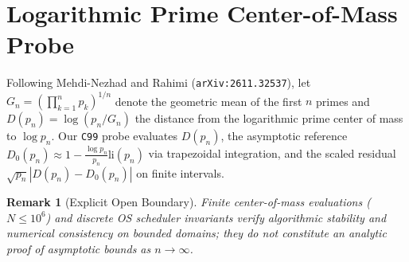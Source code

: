 \documentclass[11pt,a4paper]{article}
\newtheorem{remark}{Remark}
\begin{document}
\section{Logarithmic Prime Center-of-Mass Probe}
Following Mehdi-Nezhad and Rahimi (\texttt{arXiv:2611.32537}), let $G_n = \left(\prod_{k=1}^n p_k\right)^{1/n}$ denote the geometric mean of the first $n$ primes and $D(p_n) = \log(p_n / G_n)$ the distance from the logarithmic prime center of mass to $\log p_n$. Our \texttt{C99} probe evaluates $D(p_n)$, the asymptotic reference $D_0(p_n) \approx 1 - \frac{\log p_n}{p_n}\mathrm{li}(p_n)$ via trapezoidal integration, and the scaled residual $\sqrt{p_n}|D(p_n) - D_0(p_n)|$ on finite intervals.

\begin{remark}[Explicit Open Boundary]
Finite center-of-mass evaluations ($N \le 10^6$) and discrete OS scheduler invariants verify algorithmic stability and numerical consistency on bounded domains; they do not constitute an analytic proof of asymptotic bounds as $n \to \infty$.
\end{remark}
\end{document}
